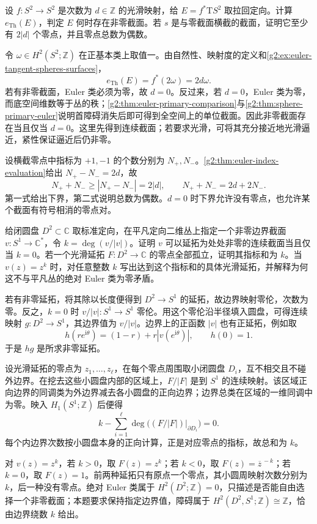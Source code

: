 \begin{exercise}\label{g2:ex:pullback-tangent-sphere-euler}
	设 \(f:S^2\to S^2\) 是次数为 \(d\in\mathbb Z\) 的光滑映射，给 \(E=f^*\mathrm TS^2\) 取拉回定向。计算 \(e_{\mathrm{Th}}(E)\)，判定 \(E\) 何时存在非零截面。若 \(s\) 是与零截面横截的截面，证明它至少有 \(2|d|\) 个零点，并且零点总数为偶数。
\end{exercise}
\begin{solution}
	令 \(\omega\in H^2(S^2;\mathbb Z)\) 在正基本类上取值一。由自然性、映射度的定义和\cref{g2:ex:euler-tangent-spheres-surfaces}，
	\[
		e_{\mathrm{Th}}(E)=f^*(2\omega)=2d\omega.
	\]
	若有非零截面，Euler 类必须为零，故 \(d=0\)。反过来，若 \(d=0\)，Euler 类为零，而底空间维数等于丛的秩；\cref{g2:thm:euler-primary-comparison}与\cref{g2:thm:sphere-primary-euler}说明首障碍消失后即可得到全空间上的单位截面。因此非零截面存在当且仅当 \(d=0\)。这里先得到连续截面；若要求光滑，可将其充分接近地光滑逼近，紧性保证逼近后仍非零。

	设横截零点中指标为 \(+1,-1\) 的个数分别为 \(N_+,N_-\)。\cref{g2:thm:euler-index-evaluation}给出 \(N_+-N_-=2d\)，故
	\[
		N_++N_-\ge|N_+-N_-|=2|d|,
		\qquad N_++N_-=2d+2N_-.
	\]
	第一式给出下界，第二式说明总数为偶数。\(d=0\) 时下界允许没有零点，也允许某个截面有符号相消的零点对。
\end{solution}

\begin{exercise}\label{g2:ex:disk-relative-euler-index}
	给闭圆盘 \(D^2\subset\mathbb C\) 取标准定向，在平凡定向二维丛上指定一个非零边界截面 \(v:S^1\to\mathbb C^*\)，令 \(k=\deg(v/|v|)\)。证明 \(v\) 可以延拓为处处非零的连续截面当且仅当 \(k=0\)。若一个光滑延拓 \(F:D^2\to\mathbb C\) 的零点全部孤立，证明其指标和为 \(k\)。当 \(v(z)=z^k\) 时，对任意整数 \(k\) 写出达到这个指标和的具体光滑延拓，并解释为何这不与平凡丛的绝对 Euler 类为零矛盾。
\end{exercise}
\begin{solution}
	若有非零延拓，将其除以长度便得到 \(D^2\to S^1\) 的延拓，故边界映射零伦，次数为零。反之，\(k=0\) 时 \(v/|v|:S^1\to S^1\) 零伦。用这个零伦沿半径填入圆盘，可得连续映射 \(g:D^2\to S^1\)，其边界值为 \(v/|v|\)。边界上的正函数 \(|v|\) 也有正延拓，例如取
	\[
		h(re^{\mathrm i\theta})=(1-r)+r|v(e^{\mathrm i\theta})|,
		\qquad h(0)=1.
	\]
	于是 \(hg\) 是所求非零延拓。

	设光滑延拓的零点为 \(z_1,\ldots,z_\ell\)，在每个零点周围取小闭圆盘 \(D_i\)，互不相交且不碰外边界。在挖去这些小圆盘内部的区域上，\(F/|F|\) 是到 \(S^1\) 的连续映射。该区域正向边界的同调类为外边界减去各小圆盘的正向边界；边界总类在区域的一维同调中为零。映入 \(H_1(S^1;\mathbb Z)\) 后便得
	\[
		k-\sum_{i=1}^\ell\deg\bigl((F/|F|)|_{\partial D_i}\bigr)=0.
	\]
	每个内边界次数按小圆盘本身的正向计算，正是对应零点的指标，故总和为 \(k\)。

	对 \(v(z)=z^k\)，若 \(k>0\)，取 \(F(z)=z^k\)；若 \(k<0\)，取 \(F(z)=\overline z^{\,-k}\)；若 \(k=0\)，取 \(F(z)=1\)。前两种延拓只有原点一个零点，其小圆周映射次数分别为 \(k\)，后一种没有零点。绝对 Euler 类属于 \(H^2(D^2;\mathbb Z)=0\)，只描述是否能自由选择一个非零截面；本题要求保持指定边界值，障碍属于 \(H^2(D^2,S^1;\mathbb Z)\cong\mathbb Z\)，恰由边界绕数 \(k\) 给出。
\end{solution}


